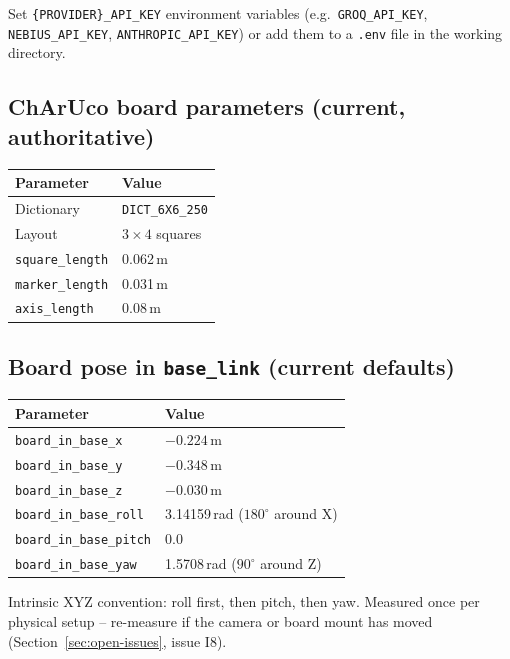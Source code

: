Set \texttt{\{PROVIDER\}\_API\_KEY} environment variables (e.g.\
\texttt{GROQ\_API\_KEY}, \texttt{NEBIUS\_API\_KEY}, \texttt{ANTHROPIC\_API\_KEY})
or add them to a \texttt{.env} file in the working directory.

\subsection{ChArUco board parameters (current, authoritative)}

\begin{center}
\begin{tabular}{@{}ll@{}}
\toprule
\textbf{Parameter} & \textbf{Value} \\
\midrule
Dictionary & \texttt{DICT\_6X6\_250} \\
Layout & $3 \times 4$ squares \\
\texttt{square\_length} & 0.062\,m \\
\texttt{marker\_length} & 0.031\,m \\
\texttt{axis\_length} & 0.08\,m \\
\bottomrule
\end{tabular}
\end{center}

\subsection{Board pose in \texttt{base\_link} (current defaults)}

\begin{center}
\begin{tabular}{@{}ll@{}}
\toprule
\textbf{Parameter} & \textbf{Value} \\
\midrule
\texttt{board\_in\_base\_x} & $-0.224$\,m \\
\texttt{board\_in\_base\_y} & $-0.348$\,m \\
\texttt{board\_in\_base\_z} & $-0.030$\,m \\
\texttt{board\_in\_base\_roll} & 3.14159\,rad ($180^\circ$ around X) \\
\texttt{board\_in\_base\_pitch} & 0.0 \\
\texttt{board\_in\_base\_yaw} & 1.5708\,rad ($90^\circ$ around Z) \\
\bottomrule
\end{tabular}
\end{center}

Intrinsic XYZ convention: roll first, then pitch, then yaw. Measured once
per physical setup -- re-measure if the camera or board mount has moved
(Section~\ref{sec:open-issues}, issue I8).

